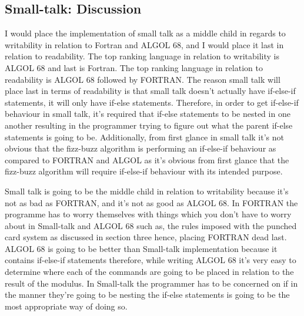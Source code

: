 \documentclass[
	12pt, %
]{fphw}
\begin{document}
\subsection{Small-talk: Discussion}
I would place the implementation of small talk as a middle child in regards to
writability in relation to Fortran and ALGOL 68, and I would place it last in
relation to readability. The top ranking language in relation to writability is
ALGOL 68 and last is Fortran. The top ranking language in relation to readability
is ALGOL 68 followed by FORTRAN. The reason small talk will place last in terms
of readability is that small talk doesn't actually have if-else-if statements, it
will only have if-else statements. Therefore, in order to get if-else-if behaviour
in small talk, it's required that if-else statements to be nested in one another
resulting in the programmer trying to figure out what the parent if-else statements
is going to be. Additionally, from first glance in small talk it's not obvious
that the fizz-buzz algorithm is performing an if-else-if behaviour as compared to
FORTRAN and ALGOL as it's obvious from first glance that the
fizz-buzz algorithm will require if-else-if behaviour with its intended purpose. \par

Small talk is going to be the middle child in relation to writability because
it's not as bad as FORTRAN, and it's not as good as ALGOL 68. In FORTRAN the programme
has to worry themselves with things which you don't have to worry about in Small-talk
and ALGOL 68 such as, the rules imposed with the punched card system as discussed
in section three hence, placing FORTRAN dead last. ALGOL 68 is going to be better
than  Small-talk implementation because it contains if-else-if statements
therefore, while writing ALGOL 68 it's very easy to determine where each of the
commands are going to be placed in relation to the result of the modulus.
In Small-talk the programmer has to be concerned on if in the manner they're
going to be nesting the if-else statements is going to be the most appropriate
way of doing so.
\end{document}
